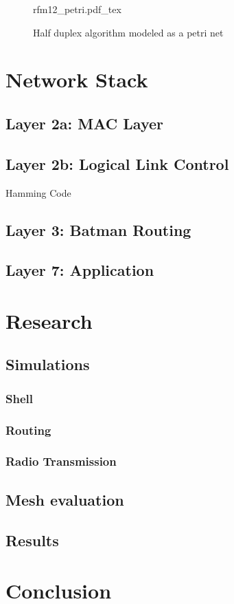 \begin{figure}[H]
\centering
{rfm12_petri.pdf_tex}
\caption{Half duplex algorithm modeled as a petri net}
\end{figure}

\chapter{Network Stack}
\section{Layer 2a: MAC Layer}
\section{Layer 2b: Logical Link Control}
Hamming Code
\section{Layer 3: Batman Routing}
\section{Layer 7: Application}

\chapter{Research}
\section{Simulations}
\subsection{Shell}
\subsection{Routing}
\subsection{Radio Transmission}
\section{Mesh evaluation}
\section{Results}

\chapter{Conclusion}
